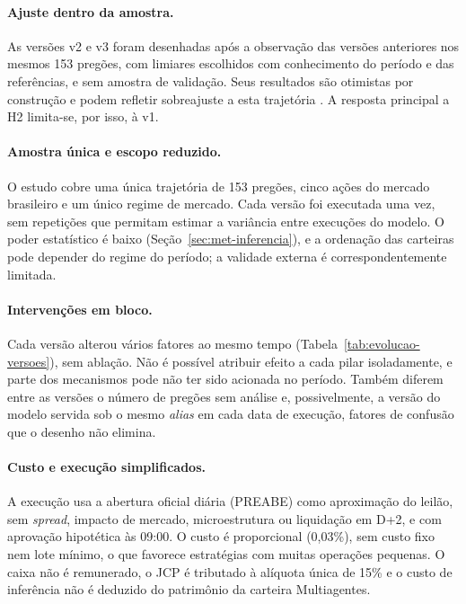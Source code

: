 \documentclass{eic-bcc-tcc}
\begin{document}
\paragraph{Ajuste dentro da amostra.} As versões v2 e v3 foram desenhadas após a observação das versões anteriores nos mesmos 153 pregões, com limiares escolhidos com conhecimento do período e das referências, e sem amostra de validação. Seus resultados são otimistas por construção e podem refletir sobreajuste a esta trajetória \citep{White2000, Bailey2017}. A resposta principal a H2 limita-se, por isso, à v1.

\paragraph{Amostra única e escopo reduzido.} O estudo cobre uma única trajetória de 153 pregões, cinco ações do mercado brasileiro e um único regime de mercado. Cada versão foi executada uma vez, sem repetições que permitam estimar a variância entre execuções do modelo. O poder estatístico é baixo (Seção~\ref{sec:met-inferencia}), e a ordenação das carteiras pode depender do regime do período; a validade externa é correspondentemente limitada.

\paragraph{Intervenções em bloco.} Cada versão alterou vários fatores ao mesmo tempo (Tabela~\ref{tab:evolucao-versoes}), sem ablação. Não é possível atribuir efeito a cada pilar isoladamente, e parte dos mecanismos pode não ter sido acionada no período. Também diferem entre as versões o número de pregões sem análise e, possivelmente, a versão do modelo servida sob o mesmo \textit{alias} em cada data de execução, fatores de confusão que o desenho não elimina.

\paragraph{Custo e execução simplificados.} A execução usa a abertura oficial diária (PREABE) como aproximação do leilão, sem \textit{spread}, impacto de mercado, microestrutura ou liquidação em D+2, e com aprovação hipotética às 09:00. O custo é proporcional (0,03\%), sem custo fixo nem lote mínimo, o que favorece estratégias com muitas operações pequenas. O caixa não é remunerado, o JCP é tributado à alíquota única de 15\% e o custo de inferência não é deduzido do patrimônio da carteira Multiagentes.
\end{document}
